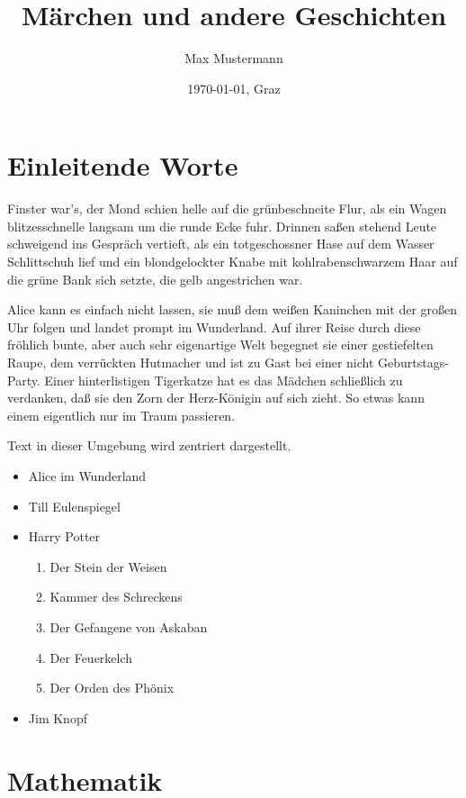 \documentclass[11pt]{scrartcl}
\title{Märchen und andere Geschichten}
\author{Max Mustermann}
\date{\today{}, Graz}
\begin{document}
\maketitle
\tableofcontents

\section{Einleitende Worte}
\label{sec:einleitende-worte}

Finster war's, der Mond schien helle auf die grünbeschneite Flur, als
ein Wagen blitzesschnelle langsam um die runde Ecke fuhr. Drinnen
saßen stehend Leute schweigend ins Gespräch vertieft, als ein
totgeschossner Hase auf dem Wasser Schlittschuh lief und ein
blondgelockter Knabe mit kohlrabenschwarzem Haar auf die grüne Bank
sich setzte, die gelb angestrichen war.

Alice kann es einfach nicht lassen, sie muß dem weißen Kaninchen mit
der großen Uhr folgen und landet prompt im Wunderland. Auf ihrer Reise
durch diese fröhlich bunte, aber auch sehr eigenartige Welt begegnet
sie einer gestiefelten Raupe, dem verrückten Hutmacher und ist zu Gast
bei einer nicht Geburtstags-Party. Einer hinterlistigen Tigerkatze hat
es das Mädchen schließlich zu verdanken, daß sie den Zorn der
Herz-Königin auf sich zieht. So etwas kann einem eigentlich nur im
Traum passieren.

\begin{center}
	Text in dieser Umgebung wird zentriert dargestellt.
\end{center}

\begin{itemize}
 	\item Alice im Wunderland
 	\item Till Eulenspiegel
 	\item Harry Potter
 	\begin{enumerate}
    		\item Der Stein der Weisen
    		\item Kammer des Schreckens
    		\item Der Gefangene von Askaban
    		\item Der Feuerkelch
    		\item Der Orden des Phönix
  	\end{enumerate}
  	\item Jim Knopf
\end{itemize}

\section{Mathematik}
\label{sec:mathematik}
 
\end{document}

